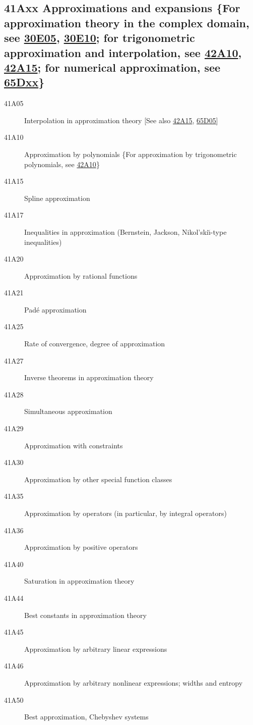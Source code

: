 \documentclass[letterpaper]{article}
\begin{document}
\subsection*{41Axx  Approximations and expansions \{For approximation theory in the complex domain, see \hyperref[30E05]{30E05}, \hyperref[30E10]{30E10}; for trigonometric approximation and interpolation, see \hyperref[42A10]{42A10}, \hyperref[42A15]{42A15}; for numerical approximation, see \hyperref[65Dxx]{65Dxx}\} }\label{41Axx}
\begin{description}  
\item [41A05]\label{41A05} Interpolation in approximation theory [See also \hyperref[42A15]{42A15}, \hyperref[65D05]{65D05}]
\item [41A10]\label{41A10} Approximation by polynomials \{For approximation by trigonometric polynomials, see \hyperref[42A10]{42A10}\}
\item [41A15]\label{41A15} Spline approximation
\item [41A17]\label{41A17} Inequalities in approximation (Bernstein, Jackson, Nikol'ski\u{\i}-type inequalities)
\item [41A20]\label{41A20} Approximation by rational functions
\item [41A21]\label{41A21} Pad\'{e} approximation
\item [41A25]\label{41A25} Rate of convergence, degree of approximation
\item [41A27]\label{41A27} Inverse theorems in approximation theory
\item [41A28]\label{41A28} Simultaneous approximation
\item [41A29]\label{41A29} Approximation with constraints
\item [41A30]\label{41A30} Approximation by other special function classes
\item [41A35]\label{41A35} Approximation by operators (in particular, by integral operators)
\item [41A36]\label{41A36} Approximation by positive operators
\item [41A40]\label{41A40} Saturation in approximation theory
\item [41A44]\label{41A44} Best constants in approximation theory
\item [41A45]\label{41A45} Approximation by arbitrary linear expressions
\item [41A46]\label{41A46} Approximation by arbitrary nonlinear expressions; widths and entropy
\item [41A50]\label{41A50} Best approximation, Chebyshev systems

\end{description}
\end{document}
